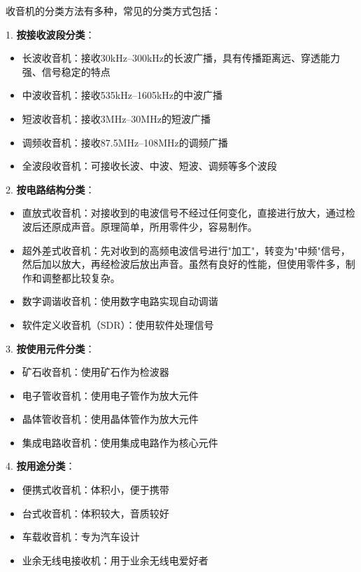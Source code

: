 \documentclass[12pt,UTF8]{ctexbook}
\begin{document}
收音机的分类方法有多种，常见的分类方式包括：

1. \textbf{按接收波段分类}：
   \begin{itemize}[leftmargin=3.5em]
   \item 长波收音机：接收30kHz--300kHz的长波广播，具有传播距离远、穿透能力强、信号稳定的特点
   \item 中波收音机：接收535kHz--1605kHz的中波广播
   \item 短波收音机：接收3MHz--30MHz的短波广播
   \item 调频收音机：接收87.5MHz--108MHz的调频广播
   \item 全波段收音机：可接收长波、中波、短波、调频等多个波段
   \end{itemize}

2. \textbf{按电路结构分类}：
   \begin{itemize}[leftmargin=3.5em]
   \item 直放式收音机：对接收到的电波信号不经过任何变化，直接进行放大，通过检波后还原成声音。原理简单，所用零件少，容易制作。
   \item 超外差式收音机：先对收到的高频电波信号进行"加工"，转变为"中频"信号，然后加以放大，再经检波后放出声音。虽然有良好的性能，但使用零件多，制作和调整都比较复杂。
   \item 数字调谐收音机：使用数字电路实现自动调谐
   \item 软件定义收音机（SDR）：使用软件处理信号
   \end{itemize}

3. \textbf{按使用元件分类}：
   \begin{itemize}[leftmargin=3.5em]
   \item 矿石收音机：使用矿石作为检波器
   \item 电子管收音机：使用电子管作为放大元件
   \item 晶体管收音机：使用晶体管作为放大元件
   \item 集成电路收音机：使用集成电路作为核心元件
   \end{itemize}

4. \textbf{按用途分类}：
   \begin{itemize}[leftmargin=3.5em]
   \item 便携式收音机：体积小，便于携带
   \item 台式收音机：体积较大，音质较好
   \item 车载收音机：专为汽车设计
   \item 业余无线电接收机：用于业余无线电爱好者
   \end{itemize}
\end{document}
